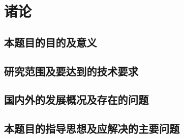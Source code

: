 \chapter{诸论}
\section{本题目的目的及意义}
\section{研究范围及要达到的技术要求}
\section{国内外的发展概况及存在的问题}
\section{本题目的指导思想及应解决的主要问题}
